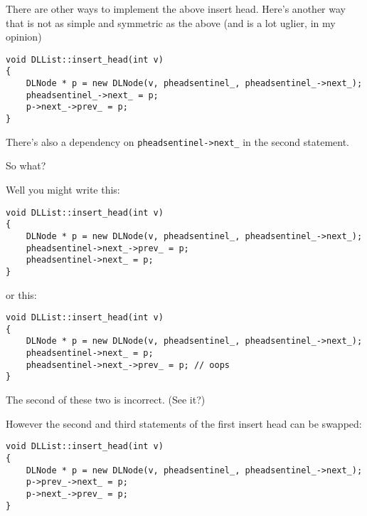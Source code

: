 There are other ways to implement the above insert head.
Here's another way that is not as simple and symmetric as the above
(and is a lot uglier, in my opinion)
\begin{Verbatim}[frame=single,fontsize=\footnotesize]
void DLList::insert_head(int v)
{
    DLNode * p = new DLNode(v, pheadsentinel_, pheadsentinel_->next_);
    pheadsentinel_->next_ = p;
    p->next_->prev_ = p;
}
\end{Verbatim}
There's also a dependency on \verb!pheadsentinel->next_! in the second
statement.

So what?

Well you might write this:
\begin{Verbatim}[frame=single,fontsize=\footnotesize]
void DLList::insert_head(int v)
{
    DLNode * p = new DLNode(v, pheadsentinel_, pheadsentinel_->next_);
    pheadsentinel->next_->prev_ = p;
    pheadsentinel->next_ = p;
}
\end{Verbatim}
or this:
\begin{Verbatim}[frame=single,fontsize=\footnotesize]
void DLList::insert_head(int v)
{
    DLNode * p = new DLNode(v, pheadsentinel_, pheadsentinel_->next_);
    pheadsentinel->next_ = p;
    pheadsentinel->next_->prev_ = p; // oops 
}
\end{Verbatim}
The second of these two is incorrect. (See it?)

However the second and third statements of the first
insert head can be swapped:
\begin{Verbatim}[frame=single,fontsize=\footnotesize]
void DLList::insert_head(int v)
{
    DLNode * p = new DLNode(v, pheadsentinel_, pheadsentinel_->next_);
    p->prev_->next_ = p;
    p->next_->prev_ = p;
}
\end{Verbatim}

